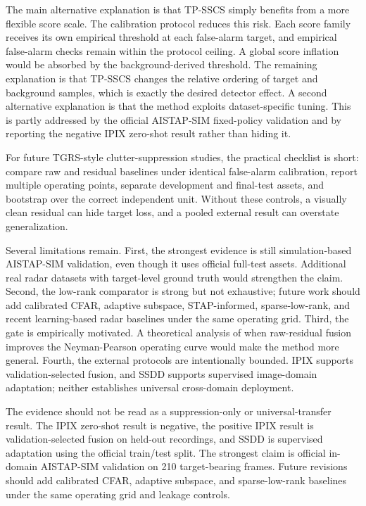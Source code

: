\documentclass[journal]{IEEEtran}
\begin{document}
The main alternative explanation is that TP-SSCS simply benefits from a more flexible score scale. The calibration protocol reduces this risk. Each score family receives its own empirical threshold at each false-alarm target, and empirical false-alarm checks remain within the protocol ceiling. A global score inflation would be absorbed by the background-derived threshold. The remaining explanation is that TP-SSCS changes the relative ordering of target and background samples, which is exactly the desired detector effect. A second alternative explanation is that the method exploits dataset-specific tuning. This is partly addressed by the official AISTAP-SIM fixed-policy validation and by reporting the negative IPIX zero-shot result rather than hiding it.

For future TGRS-style clutter-suppression studies, the practical checklist is short: compare raw and residual baselines under identical false-alarm calibration, report multiple operating points, separate development and final-test assets, and bootstrap over the correct independent unit. Without these controls, a visually clean residual can hide target loss, and a pooled external result can overstate generalization.

Several limitations remain. First, the strongest evidence is still simulation-based AISTAP-SIM validation, even though it uses official full-test assets. Additional real radar datasets with target-level ground truth would strengthen the claim. Second, the low-rank comparator is strong but not exhaustive; future work should add calibrated CFAR, adaptive subspace, STAP-informed, sparse-low-rank, and recent learning-based radar baselines under the same operating grid. Third, the gate is empirically motivated. A theoretical analysis of when raw-residual fusion improves the Neyman-Pearson operating curve would make the method more general. Fourth, the external protocols are intentionally bounded. IPIX supports validation-selected fusion, and SSDD supports supervised image-domain adaptation; neither establishes universal cross-domain deployment.

The evidence should not be read as a suppression-only or universal-transfer result. The IPIX zero-shot result is negative, the positive IPIX result is validation-selected fusion on held-out recordings, and SSDD is supervised adaptation using the official train/test split. The strongest claim is official in-domain AISTAP-SIM validation on 210 target-bearing frames. Future revisions should add calibrated CFAR, adaptive subspace, and sparse-low-rank baselines under the same operating grid and leakage controls.
\end{document}
